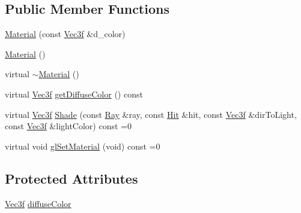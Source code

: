 \subsection*{Public Member Functions}
\begin{DoxyCompactItemize}
\item 
\hyperlink{classMaterial_a35eb3afb51f8d1425df2da47e8030fad}{Material} (const \hyperlink{classVec3f}{Vec3f} \&d\+\_\+color)
\item 
\hyperlink{classMaterial_a137e987401b63eb7c6c27c3e38bc74b5}{Material} ()
\item 
virtual \hyperlink{classMaterial_a179e16d6a1bd4a0f039b8e4cbf2ade30}{$\sim$\+Material} ()
\item 
virtual \hyperlink{classVec3f}{Vec3f} \hyperlink{classMaterial_a83b7c9dcae7d529879d90c920892e611}{get\+Diffuse\+Color} () const 
\item 
virtual \hyperlink{classVec3f}{Vec3f} \hyperlink{classMaterial_ac920053a1283ac5c4ed83b3a3282270e}{Shade} (const \hyperlink{classRay}{Ray} \&ray, const \hyperlink{classHit}{Hit} \&hit, const \hyperlink{classVec3f}{Vec3f} \&dir\+To\+Light, const \hyperlink{classVec3f}{Vec3f} \&light\+Color) const =0
\item 
virtual void \hyperlink{classMaterial_a44425af1be1191f95445ff741b573d53}{gl\+Set\+Material} (void) const =0
\end{DoxyCompactItemize}
\subsection*{Protected Attributes}
\begin{DoxyCompactItemize}
\item 
\hyperlink{classVec3f}{Vec3f} \hyperlink{classMaterial_ae81bccaee22b88d46074b843dc7bdc32}{diffuse\+Color}
\end{DoxyCompactItemize}



